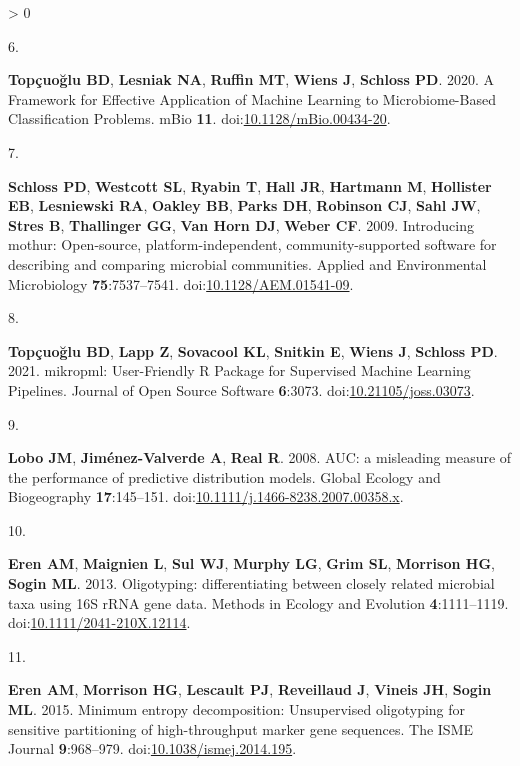 \documentclass[
]{article}
\newlength{\cslhangindent}
\newlength{\csllabelwidth}
\newenvironment{CSLReferences}[2] %
 {%
  \setlength{\parindent}{0pt}
  \ifodd #1 \everypar{\setlength{\hangindent}{\cslhangindent}}\ignorespaces\fi
  \ifnum #2 > 0
  \setlength{\parskip}{#2\baselineskip}
  \fi
 }%
 {}
\newcommand{\CSLLeftMargin}[1]{\parbox[t]{\csllabelwidth}{#1}}
\newcommand{\CSLRightInline}[1]{\parbox[t]{\linewidth - \csllabelwidth}{#1}\break}
\begin{document}
\begin{CSLReferences}{0}{0}
\leavevmode\hypertarget{ref-topuxe7uolu2020}{}%
\CSLLeftMargin{6. }
\CSLRightInline{\textbf{Topçuoğlu BD}, \textbf{Lesniak NA},
\textbf{Ruffin MT}, \textbf{Wiens J}, \textbf{Schloss PD}. 2020. A
Framework for Effective Application of Machine Learning to
Microbiome-Based Classification Problems. mBio \textbf{11}.
doi:\href{https://doi.org/10.1128/mBio.00434-20}{10.1128/mBio.00434-20}.}

\leavevmode\hypertarget{ref-schloss2009}{}%
\CSLLeftMargin{7. }
\CSLRightInline{\textbf{Schloss PD}, \textbf{Westcott SL},
\textbf{Ryabin T}, \textbf{Hall JR}, \textbf{Hartmann M},
\textbf{Hollister EB}, \textbf{Lesniewski RA}, \textbf{Oakley BB},
\textbf{Parks DH}, \textbf{Robinson CJ}, \textbf{Sahl JW}, \textbf{Stres
B}, \textbf{Thallinger GG}, \textbf{Van Horn DJ}, \textbf{Weber CF}.
2009. Introducing mothur: Open-source, platform-independent,
community-supported software for describing and comparing microbial
communities. Applied and Environmental Microbiology
\textbf{75}:7537--7541.
doi:\href{https://doi.org/10.1128/AEM.01541-09}{10.1128/AEM.01541-09}.}

\leavevmode\hypertarget{ref-topuxe7uolu2021}{}%
\CSLLeftMargin{8. }
\CSLRightInline{\textbf{Topçuoğlu BD}, \textbf{Lapp Z}, \textbf{Sovacool
KL}, \textbf{Snitkin E}, \textbf{Wiens J}, \textbf{Schloss PD}. 2021.
mikropml: User-Friendly R Package for Supervised Machine Learning
Pipelines. Journal of Open Source Software \textbf{6}:3073.
doi:\href{https://doi.org/10.21105/joss.03073}{10.21105/joss.03073}.}

\leavevmode\hypertarget{ref-lobo2008}{}%
\CSLLeftMargin{9. }
\CSLRightInline{\textbf{Lobo JM}, \textbf{Jiménez-Valverde A},
\textbf{Real R}. 2008. AUC: a misleading measure of the performance of
predictive distribution models. Global Ecology and Biogeography
\textbf{17}:145--151.
doi:\href{https://doi.org/10.1111/j.1466-8238.2007.00358.x}{10.1111/j.1466-8238.2007.00358.x}.}

\leavevmode\hypertarget{ref-eren2013}{}%
\CSLLeftMargin{10. }
\CSLRightInline{\textbf{Eren AM}, \textbf{Maignien L}, \textbf{Sul WJ},
\textbf{Murphy LG}, \textbf{Grim SL}, \textbf{Morrison HG},
\textbf{Sogin ML}. 2013. Oligotyping: differentiating between closely
related microbial taxa using 16S rRNA gene data. Methods in Ecology and
Evolution \textbf{4}:1111--1119.
doi:\href{https://doi.org/10.1111/2041-210X.12114}{10.1111/2041-210X.12114}.}

\leavevmode\hypertarget{ref-eren2015}{}%
\CSLLeftMargin{11. }
\CSLRightInline{\textbf{Eren AM}, \textbf{Morrison HG}, \textbf{Lescault
PJ}, \textbf{Reveillaud J}, \textbf{Vineis JH}, \textbf{Sogin ML}. 2015.
Minimum entropy decomposition: Unsupervised oligotyping for sensitive
partitioning of high-throughput marker gene sequences. The ISME Journal
\textbf{9}:968--979.
doi:\href{https://doi.org/10.1038/ismej.2014.195}{10.1038/ismej.2014.195}.}


\end{CSLReferences}
\end{document}
